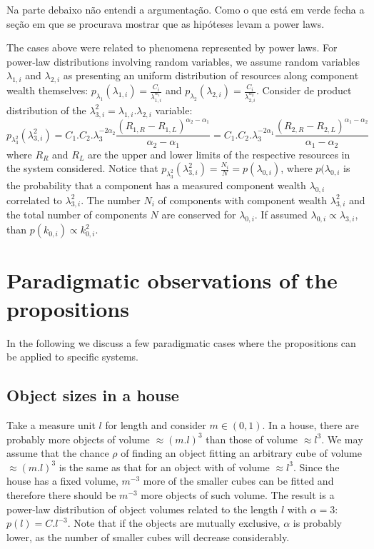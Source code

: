 \documentclass[a4paper, 11pt]{article} %
\begin{document}
Na parte debaixo não entendi a argumentação. Como o que está em verde fecha a seção em que se procurava mostrar que as hipóteses levam a power laws.

The cases above were related to phenomena represented by power laws.
For power-law distributions involving random variables, we assume
random variables
$\lambda_{1,i}$ and $\lambda_{2,i}$ as presenting an uniform distribution of resources along component wealth
themselves:
$p_{\lambda_{1}}(\lambda_{1,i})=\frac{C_i}{\lambda_{1,i}^{\alpha_1}}$
and
$p_{\lambda_{2}}(\lambda_{2,i})=\frac{C_i}{\lambda_{2,i}^{\alpha_2}}$.
Consider de product distribution of the
$\lambda_{3,i}^2=\lambda_{1,i}.\lambda_{2,i}$
variable:
\begin{equation}
p_{\lambda_3^2}(\lambda_{3,i}^2)=C_1.C_2.\lambda_3^{-2\alpha_2}\frac{(R_{1,R}-R_{1,L})^{\alpha_2-\alpha_1}}{\alpha_2-\alpha_1}
=C_1.C_2.\lambda_3^{-2\alpha_1}\frac{(R_{2,R}-R_{2,L})^{\alpha_1-\alpha_2}}{\alpha_1-\alpha_2}
\end{equation}
where $R_R$ and $R_L$ are the upper and lower limits of the respective resources in the system considered.
Notice that $p_{\lambda_3^2}(\lambda_{3,i}^2)=\frac{N_i}{N}=p(\lambda_{0,i})$,
where $p(\lambda_{0,i}$ is the probability that a component has a measured
component wealth $\lambda_{0,i}$ correlated to $\lambda_{3,i}^2$. 
The number $N_i$ of components with component wealth $\lambda_{3,i}^2$ and the total
number of components $N$ are conserved for $\lambda_{0,i}$.
If assumed $\lambda_{0,i} \propto \lambda_{3,i}$, than
$p(k_{0,i}) \propto k_{0,i}^2$.


\section{Paradigmatic observations of the propositions}\label{sec:par}

In the following we discuss a few paradigmatic cases where the propositions can be applied to specific systems. 
\subsection{Object sizes in a house}\label{sec:siz}
Take a measure unit $l$ for length and consider $m \in (0,1)$.
In a house, there are probably more objects of volume $\approx (m.l)^3$ than those of volume $\approx l^3$. We may assume that the chance $\rho$ of finding an object fitting an arbitrary cube of volume $\approx (m.l)^3$ is the same as that for an object with of volume $\approx l^3$.
Since the house has a fixed volume, $m^{-3}$ more of
the smaller cubes can be fitted and therefore there should be $m^{-3}$ more objects of such volume.  The result is a power-law distribution of object volumes related to the length $l$ with $\alpha=3$:
$p(l)=C.l^{-3}$. Note that if the objects are mutually exclusive,
$\alpha$ is probably lower, as the number of smaller
cubes will decrease considerably.
\end{document}
